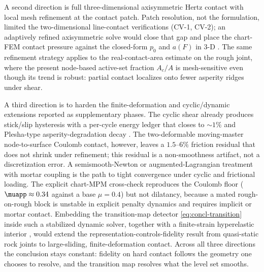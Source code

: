 A second direction is full three-dimensional axisymmetric Hertz contact with local mesh
refinement at the contact patch. Patch resolution, not the formulation, limited the
two-dimensional line-contact verifications (CV-1, CV-2); an adaptively refined axisymmetric
solve would close that gap and place the chart-FEM contact pressure against the closed-form
$p_0$ and $a(F)$ in 3-D \citep{johnson1985contact,kikuchi1988contact}. The same refinement
strategy applies to the real-contact-area estimate on the rough joint, where the present
node-based active-set fraction $A_c/A$ is mesh-sensitive even though its trend is robust:
partial contact localizes onto fewer asperity ridges under shear.

A third direction is to harden the finite-deformation and cyclic/dynamic extensions reported as
supplementary phases. The cyclic shear already produces stick/slip hysteresis with a per-cycle
energy ledger that closes to $\sim1\%$ and Plesha-type asperity-degradation decay
\citep{plesha1987constitutive,goodman1976methods}. The two-deformable moving-master
node-to-surface Coulomb contact, however, leaves a $1.5$--$6\%$ friction residual that does not
shrink under refinement; this residual is a non-smoothness artifact, not a discretization error. A
semismooth-Newton or augmented-Lagrangian treatment with mortar coupling
\citep{alart1991mixed,simo1992augmented,puso2004mortar,laursen2002computational} is the path to
tight convergence under cyclic and frictional loading. The explicit chart-MPM cross-check
reproduces the Coulomb floor ($\muapp\approx0.34$ against a base $\mu=0.4$) but not dilatancy,
because a mated rough-on-rough block is unstable in explicit penalty dynamics and requires
implicit or mortar contact. Embedding the transition-map detector \eqref{eq:concl-transition}
inside such a stabilized dynamic solver, together with a finite-strain hyperelastic interior
\citep{ball1977convexity,ciarlet1988mathematical}, would extend the
representation-controls-fidelity result from quasi-static rock joints to large-sliding,
finite-deformation contact. Across all three directions the conclusion stays constant: fidelity on
hard contact follows the geometry one chooses to resolve, and the transition map resolves what
the level set smooths.
